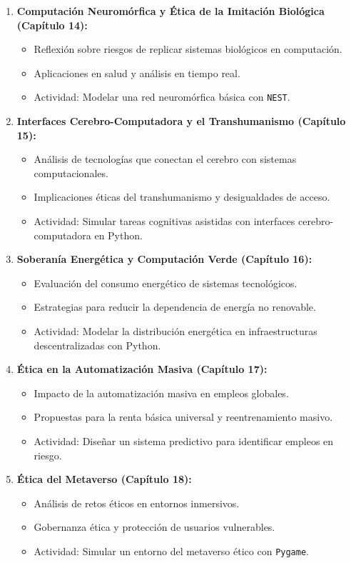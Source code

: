 \begin{refsection}
\begin{enumerate}
\item \textbf{Computación Neuromórfica y Ética de la Imitación Biológica (Capítulo 14):}  
\begin{itemize}
    \item Reflexión sobre riesgos de replicar sistemas biológicos en computación.
    \item Aplicaciones en salud y análisis en tiempo real.
    \item Actividad: Modelar una red neuromórfica básica con \texttt{NEST}.
\end{itemize}

\item \textbf{Interfaces Cerebro-Computadora y el Transhumanismo (Capítulo 15):}  
\begin{itemize}
    \item Análisis de tecnologías que conectan el cerebro con sistemas computacionales.
    \item Implicaciones éticas del transhumanismo y desigualdades de acceso.
    \item Actividad: Simular tareas cognitivas asistidas con interfaces cerebro-computadora en Python.
\end{itemize}

\item \textbf{Soberanía Energética y Computación Verde (Capítulo 16):}  
\begin{itemize}
    \item Evaluación del consumo energético de sistemas tecnológicos.
    \item Estrategias para reducir la dependencia de energía no renovable.
    \item Actividad: Modelar la distribución energética en infraestructuras descentralizadas con Python.
\end{itemize}

\item \textbf{Ética en la Automatización Masiva (Capítulo 17):}  
\begin{itemize}
    \item Impacto de la automatización masiva en empleos globales.
    \item Propuestas para la renta básica universal y reentrenamiento masivo.
    \item Actividad: Diseñar un sistema predictivo para identificar empleos en riesgo.
\end{itemize}

\item \textbf{Ética del Metaverso (Capítulo 18):}  
\begin{itemize}
    \item Análisis de retos éticos en entornos inmersivos.
    \item Gobernanza ética y protección de usuarios vulnerables.
    \item Actividad: Simular un entorno del metaverso ético con \texttt{Pygame}.
\end{itemize}


\end{enumerate}
\end{refsection}
